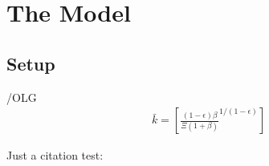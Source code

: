 \documentclass[ProjectDLO]{subfiles}
\begin{document}
\begin{minipage}{0.9\textwidth}
    \introduction
\end{minipage}

\hypertarget{The-Model}{}

\section{The Model}

\subsection{Setup}\label{subsec:Setup}


\begin{verbatimwrite}{\EqDir/OLG}
  \begin{align}%
    \bar{k} = \left[\frac{(1-\epsilon)\beta}{\Xi (1+\beta)}^{1/(1-\epsilon)} \right]
  \end{align}
\end{verbatimwrite}




\hypertarget{PF-Constrained-Solution}{}
\hypertarget{Constrained-Solution}{}







Just a citation test: \cite{DostenTest}









\onlyinsubfile{}
%
\end{document}
